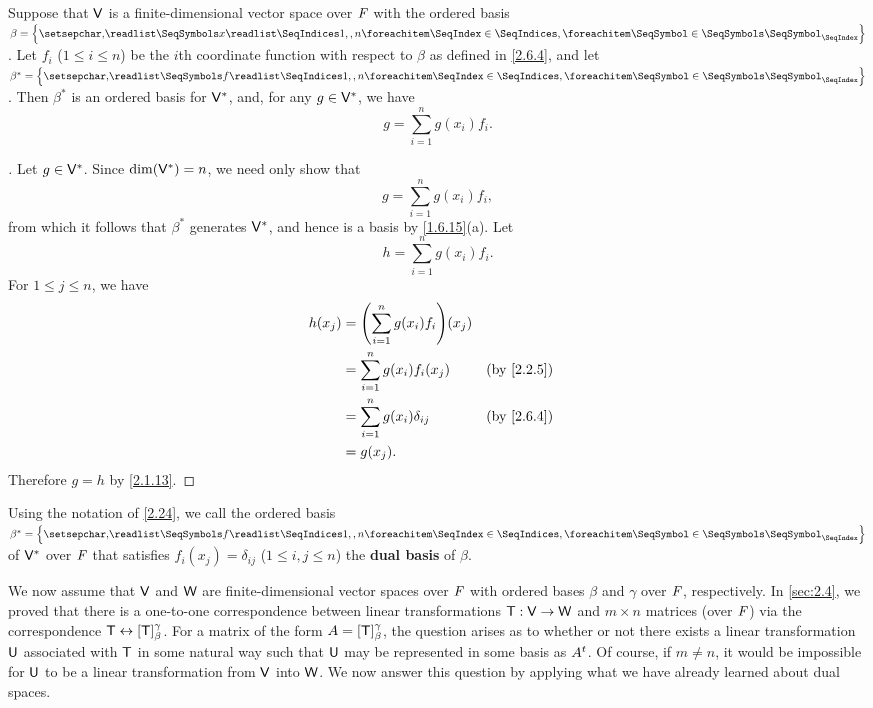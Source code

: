 \begin{thm}\label{2.24}
	Suppose that \(\mathsf{V}\) is a finite-dimensional vector space over \(\mathit{F}\) with the ordered basis \(\beta = \set{\seq{x}{1,,n}}\).
	Let \(f_i\) (\(1 \leq i \leq n\)) be the \(i\)th coordinate function with respect to \(\beta\) as defined in \cref{2.6.4}, and let \(\beta^* = \set{\seq{f}{1,,n}}\).
	Then \(\beta^*\) is an ordered basis for \(\mathsf{V}^*\), and, for any \(g \in \mathsf{V}^*\), we have
	\[
		g = \sum_{i = 1}^n g(x_i) f_i.
	\]
\end{thm}

\begin{proof}[]
	Let \(g \in \mathsf{V}^*\).
	Since \(\dim(\mathsf{V}^*) = n\), we need only show that
	\[
		g = \sum_{i = 1}^n g(x_i) f_i,
	\]
	from which it follows that \(\beta^*\) generates \(\mathsf{V}^*\), and hence is a basis by \cref{1.6.15}(a).
	Let
	\[
		h = \sum_{i = 1}^n g(x_i) f_i.
	\]
	For \(1 \leq j \leq n\), we have
	\begin{align*}
		h(x_j) & = \pa{\sum_{i = 1}^n g(x_i) f_i}(x_j)                 \\
		       & = \sum_{i = 1}^n g(x_i) f_i(x_j)      &  & \by{2.2.5} \\
		       & = \sum_{i = 1}^n g(x_i) \delta_{i j}  &  & \by{2.6.4} \\
		       & = g(x_j).
	\end{align*}
	Therefore \(g = h\) by \cref{2.1.13}.
\end{proof}

\begin{defn}\label{2.6.6}
	Using the notation of \cref{2.24}, we call the ordered basis \(\beta^* = \set{\seq{f}{1,,n}}\) of \(\mathsf{V}^*\) over \(\mathit{F}\) that satisfies \(f_i(x_j) = \delta_{i j}\) (\(1 \leq i, j \leq n\)) the \textbf{dual basis} of \(\beta\).
\end{defn}

\begin{note}
	We now assume that \(\mathsf{V}\) and \(\mathsf{W}\) are finite-dimensional vector spaces over \(\mathit{F}\) with ordered bases \(\beta\) and \(\gamma\) over \(\mathit{F}\), respectively.
	In \cref{sec:2.4}, we proved that there is a one-to-one correspondence between linear transformations \(\mathsf{T} : \mathsf{V} \to \mathsf{W}\) and \(m \times n\) matrices (over \(\mathit{F}\)) via the correspondence \(\mathsf{T} \leftrightarrow [\mathsf{T}]_{\beta}^{\gamma}\).
	For a matrix of the form \(A = [\mathsf{T}]_{\beta}^{\gamma}\), the question arises as to whether or not there exists a linear transformation \(\mathsf{U}\) associated with \(\mathsf{T}\) in some natural way such that \(\mathsf{U}\) may be represented in some basis as \({A}^{t}\).
	Of course, if \(m \neq n\), it would be impossible for \(\mathsf{U}\) to be a linear transformation from \(\mathsf{V}\) into \(\mathsf{W}\).
	We now answer this question by applying what we have already learned about dual spaces.
\end{note}

